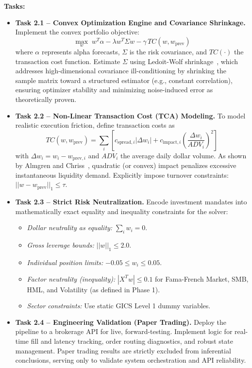 \documentclass[twoside,final]{hcmut-report}
\begin{document}
\vspace{0.5em}
\textbf{Tasks:}
\begin{itemize}
    \item \textbf{Task 2.1 -- Convex Optimization Engine and Covariance Shrinkage.} Implement the convex portfolio objective:
          \[
              \max_{w} \; w^T \alpha - \lambda w^T \Sigma w - \gamma \, TC(w, w_{\text{prev}})
          \]
          where $\alpha$ represents alpha forecasts, $\Sigma$ is the risk covariance, and $TC(\cdot)$ the transaction cost function. Estimate $\Sigma$ using Ledoit-Wolf shrinkage~\cite{LedoitWolf2004}, which addresses high-dimensional covariance ill-conditioning by shrinking the sample matrix toward a structured estimator (e.g., constant correlation), ensuring optimizer stability and minimizing noise-induced error as theoretically proven.

    \item \textbf{Task 2.2 -- Non-Linear Transaction Cost (TCA) Modeling.} To model realistic execution friction, define transaction costs as
          \[
              TC(w, w_{\text{prev}}) = \sum_{i} \left[ c_{\text{spread},i}|\Delta w_i| + c_{\text{impact},i} \left( \dfrac{\Delta w_i}{ADV_i} \right)^2 \right]
          \]
          with $\Delta w_i = w_i - w_{\text{prev},i}$ and $ADV_i$ the average daily dollar volume. As shown by Almgren and Chriss~\cite{AlmgrenChriss2000}, quadratic (or convex) impact penalizes excessive instantaneous liquidity demand. Explicitly impose turnover constraints: $||w - w_{\text{prev}}||_1 \le \tau$.

    \item \textbf{Task 2.3 -- Strict Risk Neutralization.} Encode investment mandates into mathematically exact equality and inequality constraints for the solver:
          \begin{itemize}
              \item \textit{Dollar neutrality as equality:} $\sum_i w_i = 0$.
              \item \textit{Gross leverage bounds:} $||w||_1 \leq 2.0$.
              \item \textit{Individual position limits:} $-0.05 \leq w_i \leq 0.05$.
              \item \textit{Factor neutrality (inequality):} $|X^T w| \leq 0.1$ for Fama-French Market, SMB, HML, and Volatility (as defined in Phase 1).
              \item \textit{Sector constraints:} Use static GICS Level 1 dummy variables.
          \end{itemize}

    \item \textbf{Task 2.4 -- Engineering Validation (Paper Trading).} Deploy the pipeline to a brokerage API for live, forward-testing. Implement logic for real-time fill and latency tracking, order routing diagnostics, and robust state management. Paper trading results are strictly excluded from inferential conclusions, serving only to validate system orchestration and API reliability.
\end{itemize}
\end{document}
